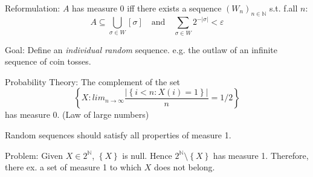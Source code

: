 \documentclass[12pt]{article}
\newcommand{\Nat}{\ensuremath{\mathbb{N}}}
\begin{document}
Reformulation: $A$ has measure 0 iff there exists a sequence
$\left( W_n \right)_{n \in \Nat}$ s.t. f.all $n$:
\[
  A \subseteq \bigcup_{\sigma \in W} [\sigma]
\quad \text{and} \quad
\sum_{\sigma \in W} 2^{-|\sigma|} < \varepsilon
\]

Goal: Define an \emph{individual random} sequence.
e.g. the outlaw of an infinite sequence of coin tosses.

Probability Theory:
The complement of the set
\[
\left\{ X : lim_{n \rightarrow \infty} \frac{|\left\{ i < n : X(i) = 1\right\}|}{n} = 1/2 \right\}
\]
has measure 0. (Law of large numbers)

Random sequences should satisfy all properties of measure 1.

Problem: Given $X \in 2^\Nat$, $\left\{ X \right\}$ is null.
Hence $2^\Nat \setminus \left\{ X \right\}$ has measure 1.
Therefore, there ex. a set of measure 1 to which $X$ does not belong.
\end{document}
